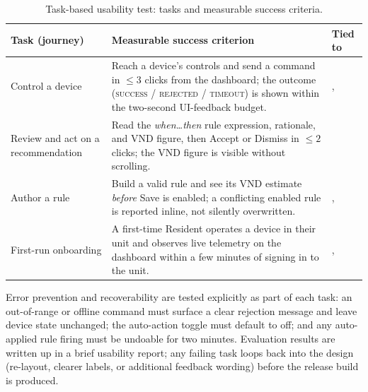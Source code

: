 \begin{table}[htbp]
  \caption{Task-based usability test: tasks and measurable success criteria.}
  \label{tab:usability-tasks}
  \begin{tabularx}{\linewidth}{@{} L{3.2cm} Y L{2.8cm} @{}}
    \toprule
    \textbf{Task (journey)} & \textbf{Measurable success criterion} & \textbf{Tied to} \\
    \midrule
    Control a device &
      Reach a device's controls and send a command in $\le 3$ clicks from the dashboard;
      the outcome (\textsc{success} / \textsc{rejected} / \textsc{timeout}) is shown
      within the two-second UI-feedback budget. &
      ,\newline {} \\
    \addlinespace
    Review and act on a recommendation &
      Read the \emph{when\ldots then} rule expression, rationale, and VND figure, then
      Accept or Dismiss in $\le 2$ clicks; the VND figure is visible without scrolling. &
       \\
    \addlinespace
    Author a rule &
      Build a valid rule and see its VND estimate \emph{before} Save is enabled; a
      conflicting enabled rule is reported inline, not silently overwritten. &
      ,\newline {} \\
    \addlinespace
    First-run onboarding &
      A first-time Resident operates a device in their unit and observes live telemetry on
      the dashboard within a few minutes of signing in to the unit. &
      ,\newline {} \\
    \bottomrule
  \end{tabularx}
\end{table}

Error prevention and recoverability are tested explicitly as part of each task: an
out-of-range or offline command must surface a clear rejection message and leave device
state unchanged; the auto-action toggle must default to off; and any auto-applied rule
firing must be undoable for two minutes.  Evaluation results are written up in a
brief usability report; any failing task loops back into the design (re-layout, clearer
labels, or additional feedback wording) before the release build is produced.
